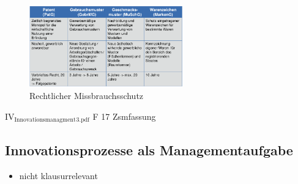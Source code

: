 \documentclass[11pt]{article}
\begin{document}
\begin{figure}[htbp]
\centering
\includegraphics[width=250px]{./pictures/inmiss.png}
\caption{Rechtlicher Missbrauchsschutz}
\end{figure} 

IV\(_{\text{Innovationsmanagment}}\)\(_{\text{3.pdf}}\) F 17 Zsmfassung
\subsection{Innovationsprozesse als Managementaufgabe}
\label{sec:org4d286a0}
\begin{itemize}
\item nicht klausurrelevant
\end{itemize}
\end{document}
